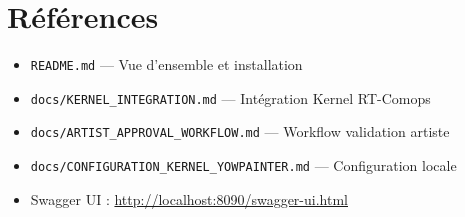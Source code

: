 \section{Références}

\begin{itemize}[noitemsep]
  \item \texttt{README.md} — Vue d'ensemble et installation
  \item \texttt{docs/KERNEL\_INTEGRATION.md} — Intégration Kernel RT-Comops
  \item \texttt{docs/ARTIST\_APPROVAL\_WORKFLOW.md} — Workflow validation artiste
  \item \texttt{docs/CONFIGURATION\_KERNEL\_YOWPAINTER.md} — Configuration locale
  \item Swagger UI : \url{http://localhost:8090/swagger-ui.html}
\end{itemize}
